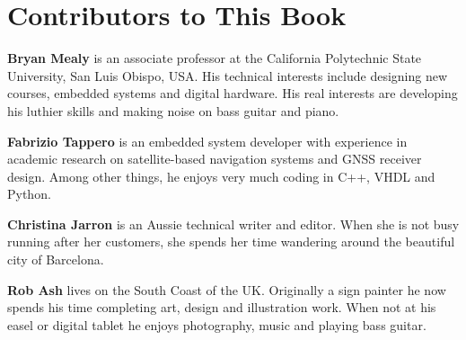 %
%
\chapter{Contributors to This Book}

\noindent
\textbf{Bryan Mealy} is an associate professor at the California Polytechnic State University, San Luis Obispo, USA. His technical interests include designing new courses, embedded systems and digital hardware. His real interests are developing his luthier skills and making noise on bass guitar and piano.

\noindent
\textbf{Fabrizio Tappero} is an embedded system developer with experience in academic research on satellite-based navigation systems and GNSS receiver design. Among other things, he enjoys very much coding in C++, VHDL and Python.

\noindent
\textbf{Christina Jarron} is an Aussie technical writer and editor. When she is not busy running after her customers, she spends her time wandering around the beautiful city of Barcelona.

\noindent
\textbf{Rob Ash} lives on the South Coast of the UK. Originally a sign painter he now spends his time completing art, design and illustration work. When not at his easel or digital tablet he enjoys photography, music and playing bass guitar.
